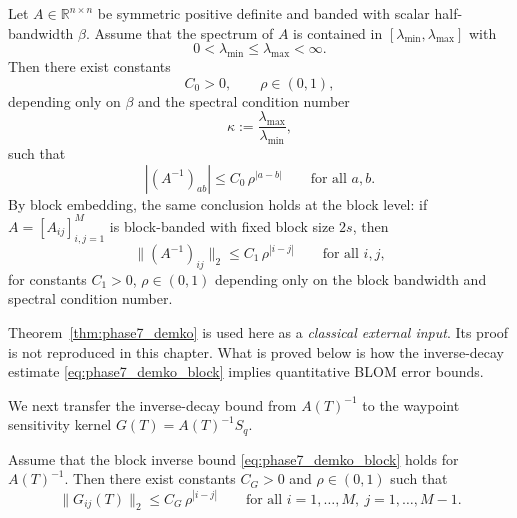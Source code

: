 \begin{theorem}
	\label{thm:phase7_demko}
	Let \(A\in\mathbb R^{n\times n}\) be symmetric positive definite and banded with scalar half-bandwidth \(\beta\).
	Assume that the spectrum of \(A\) is contained in \([\lambda_{\min},\lambda_{\max}]\) with
	\[
	0<\lambda_{\min}\le \lambda_{\max}<\infty.
	\]
	Then there exist constants
	\[
	C_0>0,
	\qquad
	\rho\in(0,1),
	\]
	depending only on \(\beta\) and the spectral condition number
	\[
	\kappa:=\frac{\lambda_{\max}}{\lambda_{\min}},
	\]
	such that
	\begin{equation}
		\label{eq:phase7_demko_scalar}
		|(A^{-1})_{ab}|
		\le
		C_0\,\rho^{|a-b|}
		\qquad
		\text{for all } a,b.
	\end{equation}
	By block embedding, the same conclusion holds at the block level: if \(A=[A_{ij}]_{i,j=1}^{M}\) is block-banded with fixed block size \(2s\), then
	\begin{equation}
		\label{eq:phase7_demko_block}
		\| (A^{-1})_{ij} \|_2
		\le
		C_1\,\rho^{|i-j|}
		\qquad
		\text{for all } i,j,
	\end{equation}
	for constants \(C_1>0\), \(\rho\in(0,1)\) depending only on the block bandwidth and spectral condition number.
\end{theorem}

\begin{remark}
	\label{rem:phase7_demko_limitation}
	Theorem~\ref{thm:phase7_demko} is used here as a \emph{classical external input}.
	Its proof is not reproduced in this chapter.
	What is proved below is how the inverse-decay estimate \eqref{eq:phase7_demko_block} implies quantitative BLOM error bounds.
\end{remark}

We next transfer the inverse-decay bound from \(A(T)^{-1}\) to the waypoint sensitivity kernel \(G(T)=A(T)^{-1}S_q\).

\begin{lemma}
	\label{lem:phase7_G_decay}
	Assume that the block inverse bound \eqref{eq:phase7_demko_block} holds for \(A(T)^{-1}\).
	Then there exist constants \(C_G>0\) and \(\rho\in(0,1)\) such that
	\begin{equation}
		\label{eq:phase7_G_decay}
		\|G_{ij}(T)\|_2
		\le
		C_G\,\rho^{|i-j|}
		\qquad
		\text{for all } i=1,\dots,M,\ j=1,\dots,M-1.
	\end{equation}
\end{lemma}

